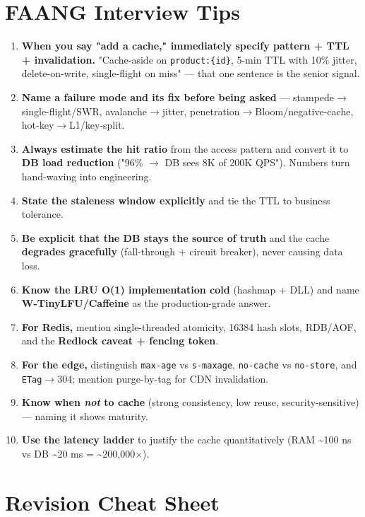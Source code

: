 \documentclass[11pt]{article}
\providecommand{\tightlist}{\setlength{\itemsep}{1pt}\setlength{\parskip}{0pt}}
\begin{document}
\section{FAANG Interview Tips}\label{faang-interview-tips}

\begin{enumerate}
\def\labelenumi{\arabic{enumi}.}
\tightlist
\item
  \textbf{When you say "add a cache," immediately specify pattern + TTL + invalidation.} "Cache-aside on \texttt{product:\{id\}}, 5-min TTL with 10\% jitter, delete-on-write, single-flight on miss" --- that one sentence is the senior signal.
\item
  \textbf{Name a failure mode and its fix before being asked} --- stampede\(\rightarrow\)single-flight/SWR, avalanche\(\rightarrow\)jitter, penetration\(\rightarrow\)Bloom/negative-cache, hot-key\(\rightarrow\)L1/key-split.
\item
  \textbf{Always estimate the hit ratio} from the access pattern and convert it to \textbf{DB load reduction} ("96\% \(\rightarrow\) DB sees 8K of 200K QPS"). Numbers turn hand-waving into engineering.
\item
  \textbf{State the staleness window explicitly} and tie the TTL to business tolerance.
\item
  \textbf{Be explicit that the DB stays the source of truth} and the cache \textbf{degrades gracefully} (fall-through + circuit breaker), never causing data loss.
\item
  \textbf{Know the LRU O(1) implementation cold} (hashmap + DLL) and name \textbf{W-TinyLFU/Caffeine} as the production-grade answer.
\item
  \textbf{For Redis,} mention single-threaded atomicity, 16384 hash slots, RDB/AOF, and the \textbf{Redlock caveat + fencing token}.
\item
  \textbf{For the edge,} distinguish \texttt{max-age} vs \texttt{s-maxage}, \texttt{no-cache} vs \texttt{no-store}, and \texttt{ETag}\(\rightarrow\)304; mention purge-by-tag for CDN invalidation.
\item
  \textbf{Know when \emph{not} to cache} (strong consistency, low reuse, security-sensitive) --- naming it shows maturity.
\item
  \textbf{Use the latency ladder} to justify the cache quantitatively (RAM \textasciitilde100 ns vs DB \textasciitilde20 ms = \textasciitilde200,000\(\times\)).
\end{enumerate}

\section{Revision Cheat Sheet}\label{revision-cheat-sheet}
\end{document}

